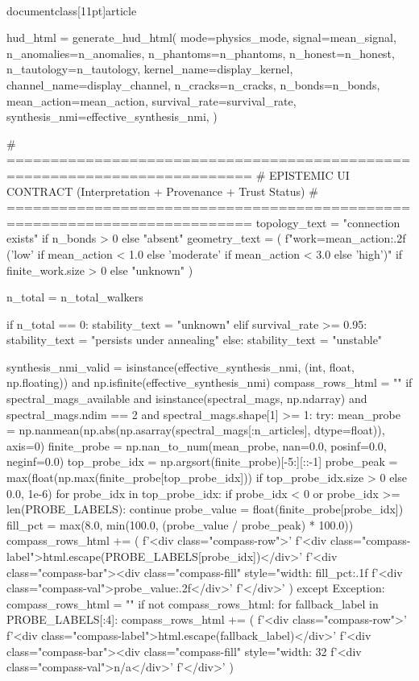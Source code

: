 \\documentclass[11pt]{article}
\begin{document}
\begin{CodeBlock}
{{{{{{    hud_html = generate_hud_html(
        mode=physics_mode,
        signal=mean_signal,
        n_anomalies=n_anomalies,
        n_phantoms=n_phantoms,
        n_honest=n_honest,
        n_tautology=n_tautology,
        kernel_name=display_kernel,
        channel_name=display_channel,
        n_cracks=n_cracks,
        n_bonds=n_bonds,
        mean_action=mean_action,
        survival_rate=survival_rate,
        synthesis_nmi=effective_synthesis_nmi,
    )

    # ==========================================================================
    # EPISTEMIC UI CONTRACT (Interpretation + Provenance + Trust Status)
    # ==========================================================================
    topology_text = "connection exists" if n_bonds > 0 else "absent"
    geometry_text = (
        f"work={mean_action:.2f} ({'low' if mean_action < 1.0 else 'moderate' if mean_action < 3.0 else 'high'})"
        if finite_work.size > 0 else "unknown"
    )

    n_total = n_total_walkers

    if n_total == 0:
        stability_text = "unknown"
    elif survival_rate >= 0.95:
        stability_text = "persists under annealing"
    else:
        stability_text = "unstable"

    synthesis_nmi_valid = isinstance(effective_synthesis_nmi, (int, float, np.floating)) and np.isfinite(effective_synthesis_nmi)
    compass_rows_html = ""
    if spectral_mags_available and isinstance(spectral_mags, np.ndarray) and spectral_mags.ndim == 2 and spectral_mags.shape[1] >= 1:
        try:
            mean_probe = np.nanmean(np.abs(np.asarray(spectral_mags[:n_articles], dtype=float)), axis=0)
            finite_probe = np.nan_to_num(mean_probe, nan=0.0, posinf=0.0, neginf=0.0)
            top_probe_idx = np.argsort(finite_probe)[-5:][::-1]
            probe_peak = max(float(np.max(finite_probe[top_probe_idx])) if top_probe_idx.size > 0 else 0.0, 1e-6)
            for probe_idx in top_probe_idx:
                if probe_idx < 0 or probe_idx >= len(PROBE_LABELS):
                    continue
                probe_value = float(finite_probe[probe_idx])
                fill_pct = max(8.0, min(100.0, (probe_value / probe_peak) * 100.0))
                compass_rows_html += (
                    f'<div class="compass-row">'
                    f'<div class="compass-label">{html.escape(PROBE_LABELS[probe_idx])}</div>'
                    f'<div class="compass-bar"><div class="compass-fill" style="width: {fill_pct:.1f}%
                    f'<div class="compass-val">{probe_value:.2f}</div>'
                    f'</div>'
                )
        except Exception:
            compass_rows_html = ""
    if not compass_rows_html:
        for fallback_label in PROBE_LABELS[:4]:
            compass_rows_html += (
                f'<div class="compass-row">'
                f'<div class="compass-label">{html.escape(fallback_label)}</div>'
                f'<div class="compass-bar"><div class="compass-fill" style="width: 32%
                f'<div class="compass-val">n/a</div>'
                f'</div>'
            )

}}}}}}
\end{CodeBlock}
\end{document}
